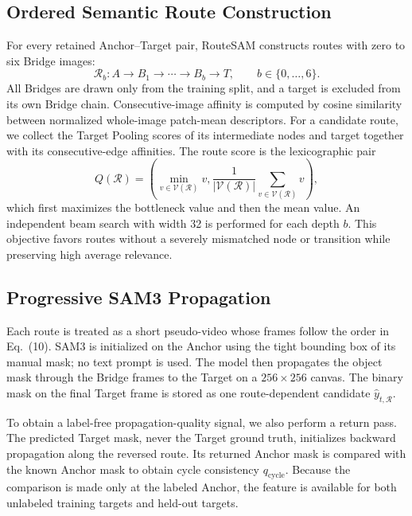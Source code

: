 \documentclass[a4paper,fleqn]{cas-dc}
\begin{document}
\subsection{Ordered Semantic Route Construction}\label{sec:route-construction}

For every retained Anchor--Target pair, RouteSAM constructs routes with zero to six Bridge images:
\begin{equation}
\mathcal{R}_{b}: A\rightarrow B_1\rightarrow\cdots\rightarrow B_b\rightarrow T,
\qquad b\in\{0,\ldots,6\}.
\end{equation}
All Bridges are drawn only from the training split, and a target is excluded from its own Bridge chain. Consecutive-image affinity is computed by cosine similarity between normalized whole-image patch-mean descriptors. For a candidate route, we collect the Target Pooling scores of its intermediate nodes and target together with its consecutive-edge affinities. The route score is the lexicographic pair
\begin{equation}
Q(\mathcal{R})=\left(\min_{v\in\mathcal{V}(\mathcal{R})}v,
\frac{1}{|\mathcal{V}(\mathcal{R})|}\sum_{v\in\mathcal{V}(\mathcal{R})}v\right),
\end{equation}
which first maximizes the bottleneck value and then the mean value. An independent beam search with width 32 is performed for each depth $b$. This objective favors routes without a severely mismatched node or transition while preserving high average relevance.

\subsection{Progressive SAM3 Propagation}\label{sec:sam3-propagation}

Each route is treated as a short pseudo-video whose frames follow the order in Eq.~(10). SAM3 is initialized on the Anchor using the tight bounding box of its manual mask; no text prompt is used. The model then propagates the object mask through the Bridge frames to the Target on a $256\times256$ canvas. The binary mask on the final Target frame is stored as one route-dependent candidate $\hat{y}_{t,\mathcal{R}}$.

To obtain a label-free propagation-quality signal, we also perform a return pass. The predicted Target mask, never the Target ground truth, initializes backward propagation along the reversed route. Its returned Anchor mask is compared with the known Anchor mask to obtain cycle consistency $q_{\mathrm{cycle}}$. Because the comparison is made only at the labeled Anchor, the feature is available for both unlabeled training targets and held-out targets.
\end{document}
